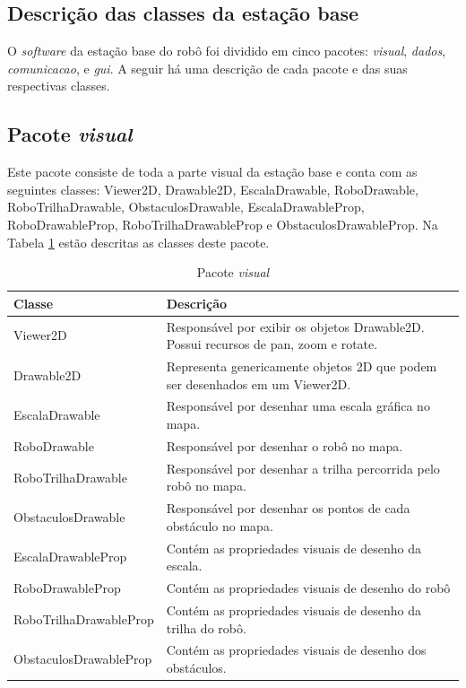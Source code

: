 \subsection{Descrição das classes da estação base}
O \textit{software} da estação base do robô foi dividido em cinco pacotes:  \textit{visual}, \textit{dados}, \textit{comunicacao}, e \textit{gui}. A seguir há uma descrição de cada pacote e das suas respectivas classes.


\subsection{Pacote \textit{visual}}

Este pacote consiste de toda a parte visual da estação base e conta com as seguintes classes: Viewer2D, Drawable2D, EscalaDrawable, RoboDrawable, RoboTrilhaDrawable, ObstaculosDrawable, EscalaDrawableProp, RoboDrawableProp, RoboTrilhaDrawableProp e ObstaculosDrawableProp. Na Tabela \ref{tab:pacote_visual} estão descritas as classes deste pacote.


\begin{table}[h]
  \centering
  \caption{Pacote \textit{visual}}
  \begin{tabular}{p{6cm}p{8cm}}
    \toprule
    \textbf{Classe} & \textbf{Descrição} \\
    \midrule
    Viewer2D & Responsável por exibir os objetos Drawable2D. Possui recursos de pan, zoom e rotate.   \\ \hline
    Drawable2D & Representa genericamente objetos 2D que podem ser desenhados em um Viewer2D. \\ \hline
    EscalaDrawable & Responsável por desenhar uma escala gráfica no mapa. \\ \hline
    RoboDrawable & Responsável por desenhar o robô no mapa. \\ \hline
    RoboTrilhaDrawable & Responsável por desenhar a trilha percorrida pelo robô no mapa. \\ \hline
    ObstaculosDrawable & Responsável por desenhar os pontos de cada obstáculo no mapa. \\ \hline
    EscalaDrawableProp & Contém as propriedades visuais de desenho da escala. \\ \hline
    RoboDrawableProp & Contém as propriedades visuais de desenho do robô \\ \hline
    RoboTrilhaDrawableProp & Contém as propriedades visuais de desenho da trilha do robô. \\ \hline
    ObstaculosDrawableProp & Contém as propriedades visuais de desenho dos obstáculos. \\
    \bottomrule
  \end{tabular}%
  \label{tab:pacote_visual}%
\end{table}%

